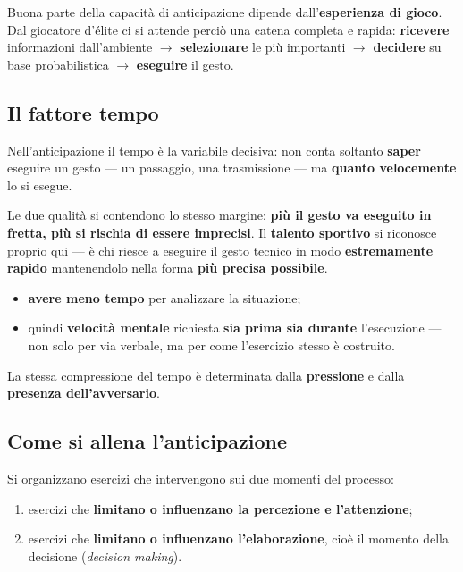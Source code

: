 Buona parte della capacità di anticipazione dipende dall'\textbf{esperienza di gioco}. Dal
giocatore d'élite ci si attende perciò una catena completa e rapida: \textbf{ricevere}
informazioni dall'ambiente $\rightarrow$ \textbf{selezionare} le più importanti $\rightarrow$
\textbf{decidere} su base probabilistica $\rightarrow$ \textbf{eseguire} il gesto.

\subsection{Il fattore tempo}

Nell'anticipazione il tempo è la variabile decisiva: non conta soltanto \textbf{saper} eseguire un
gesto --- un passaggio, una trasmissione --- ma \textbf{quanto velocemente} lo si esegue.

Le due qualità si contendono lo stesso margine: \textbf{più il gesto va eseguito in fretta, più si
rischia di essere imprecisi}. Il \textbf{talento sportivo} si riconosce proprio qui --- è chi
riesce a eseguire il gesto tecnico in modo \textbf{estremamente rapido} mantenendolo nella forma
\textbf{più precisa possibile}.

\begin{itemize}
  \item \textbf{avere meno tempo} per analizzare la situazione;
  \item quindi \textbf{velocità mentale} richiesta \textbf{sia prima sia durante} l'esecuzione ---
    non solo per via verbale, ma per come l'esercizio stesso è costruito.
\end{itemize}

La stessa compressione del tempo è determinata dalla \textbf{pressione} e dalla \textbf{presenza
dell'avversario}.

\subsection{Come si allena l'anticipazione}

Si organizzano esercizi che intervengono sui due momenti del processo:

\begin{enumerate}
  \item esercizi che \textbf{limitano o influenzano la percezione e l'attenzione};
  \item esercizi che \textbf{limitano o influenzano l'elaborazione}, cioè il momento della
    decisione (\textit{decision making}).
\end{enumerate}

